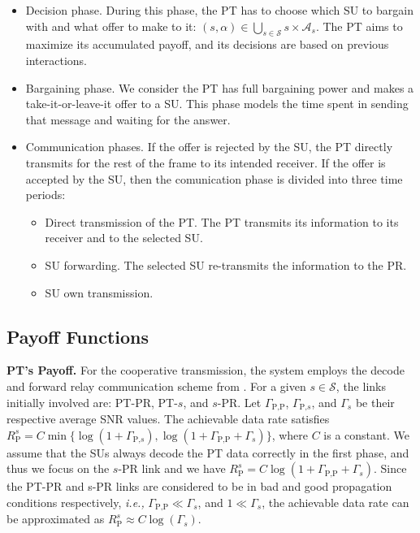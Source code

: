 \begin{itemize}
\item Decision phase. During this phase, the PT has to choose which SU to bargain with and what offer to make to it: $(s,\alpha)\in\underset{s\in\mathcal{S}}\bigcup s\times\mathcal{A}_s$. The PT aims to maximize its accumulated payoff, and its decisions are based on previous interactions.
\item Bargaining phase. We consider the PT has full bargaining power and makes a take-it-or-leave-it offer to a SU. This phase models the time spent in sending that message and waiting for the answer. 
\item Communication phases. If the offer is rejected by the SU, the PT directly transmits for the rest of the frame to its intended receiver. 
If the offer is accepted by the SU, then the comunication phase is divided into three time periods: 
\begin{itemize}
\item Direct transmission of the PT. The PT transmits its information to its receiver and to the selected SU.
\item SU forwarding. The selected SU re-transmits the information to the PR.
\item SU own transmission.
\end{itemize}
\end{itemize}

\subsection {Payoff Functions}

\textbf{PT's Payoff.} For the cooperative transmission, the system employs the decode and forward relay communication scheme from \cite{ref:Laneman2001}. 
For a given $s\in\mathcal{S}$, the links initially involved are: PT-PR, PT-$s$, and $s$-PR. Let $\Gamma_{\text{P,P}}$, $\Gamma_{\text{P,}s}$, and $\Gamma_{s}$ be their respective average SNR values.
The achievable data rate satisfies
$R_{\text{P}}^{s} = C\min\{\log(1+\Gamma_{\text{P,}s}),\log(1+\Gamma_{\text{P,P}}+\Gamma_{s})\}$, where $C$ is a constant.
We assume that the SUs always decode the PT data correctly in the first phase, and thus we focus on the $s$-PR link and 
we have 
$R_{\text{P}}^{s} = C\log(1+\Gamma_{\text{P,P}}+\Gamma_{s})$.
Since the PT-PR and s-PR links are considered to be in bad and good propagation conditions respectively, \textit{i.e.,} $\Gamma_{\text{P,P}}\ll\Gamma_{s}$, and $1 \ll\Gamma_{s}$, the achievable data rate can be approximated as
$R_{\text{P}}^{s} \approx C\log(\Gamma_{s})$.

